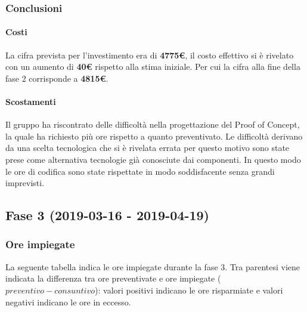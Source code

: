 	\subsubsection{Conclusioni}
		\paragraph{Costi\\}
La cifra prevista per l'investimento era di \textbf{4775€}, il costo effettivo si è rivelato con un aumento di \textbf{40€} rispetto alla stima iniziale. Per cui la cifra alla fine della fase 2 corrisponde a \textbf{4815€}.
 		
		\paragraph{Scostamenti\\}
Il gruppo ha riscontrato delle difficoltà nella progettazione del Proof of Concept, la quale ha richiesto più ore rispetto a quanto preventivato. Le difficoltà derivano da una scelta tecnologica che si è rivelata errata per questo motivo sono state prese come alternativa tecnologie già conosciute dai componenti. In questo modo le ore di codifica sono state rispettate in modo soddisfacente senza grandi imprevisti.
\newpage
\subsection{Fase 3 (2019-03-16 - 2019-04-19)}
	\subsubsection{Ore impiegate}
	La seguente tabella indica le ore impiegate durante la fase 3. Tra parentesi viene indicata la differenza tra ore preventivate e ore impiegate ($preventivo - consuntivo$): valori positivi indicano le ore risparmiate e valori negativi indicano le ore in eccesso.
	
